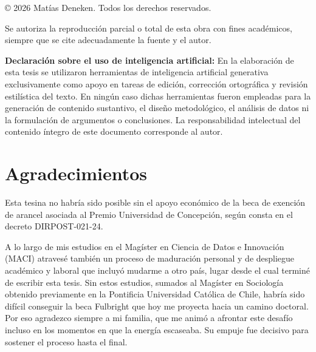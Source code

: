 \documentclass[
  letterpaper,
  numbers=noendperiod,
  fontsize=11pt,
  DIV=12,
  titlepage=false]{scrreprt}
\begin{document}
\thispagestyle{empty}
\noindent © 2026 Matías Deneken. Todos los derechos reservados.

\vspace{0.6cm}
\noindent Se autoriza la reproducción parcial o total de esta obra con fines
académicos, siempre que se cite adecuadamente la fuente y el autor.

\vspace{0.8cm}
\noindent \textbf{Declaración sobre el uso de inteligencia artificial:} En la
elaboración de esta tesis se utilizaron herramientas de inteligencia artificial
generativa exclusivamente como apoyo en tareas de edición, corrección
ortográfica y revisión estilística del texto. En ningún caso dichas herramientas
fueron empleadas para la generación de contenido sustantivo, el diseño
metodológico, el análisis de datos ni la formulación de argumentos o
conclusiones. La responsabilidad intelectual del contenido íntegro de este
documento corresponde al autor.
\clearpage



\chapter*{Agradecimientos}\label{agradecimientos}


Esta tesina no habría sido posible sin el apoyo económico de la beca de
exención de arancel asociada al Premio Universidad de Concepción, según
consta en el decreto DIRPOST-021-24.

A lo largo de mis estudios en el Magíster en Ciencia de Datos e
Innovación (MACI) atravesé también un proceso de maduración personal y
de despliegue académico y laboral que incluyó mudarme a otro país, lugar
desde el cual terminé de escribir esta tesis. Sin estos estudios,
sumados al Magíster en Sociología obtenido previamente en la Pontificia
Universidad Católica de Chile, habría sido difícil conseguir la beca
Fulbright que hoy me proyecta hacia un camino doctoral. Por eso
agradezco siempre a mi familia, que me animó a afrontar este desafío
incluso en los momentos en que la energía escaseaba. Su empuje fue
decisivo para sostener el proceso hasta el final.
\end{document}
